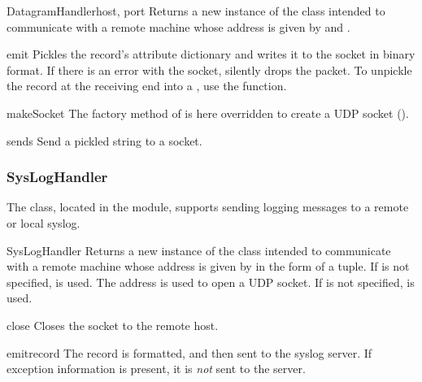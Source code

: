 \begin{classdesc}{DatagramHandler}{host, port}
Returns a new instance of the  class intended to
communicate with a remote machine whose address is given by 
and .
\end{classdesc}

\begin{methoddesc}{emit}{}
Pickles the record's attribute dictionary and writes it to the socket in
binary format. If there is an error with the socket, silently drops the
packet.
To unpickle the record at the receiving end into a , use the
 function.
\end{methoddesc}

\begin{methoddesc}{makeSocket}{}
The factory method of  is here overridden to create
a UDP socket ().
\end{methoddesc}

\begin{methoddesc}{send}{s}
Send a pickled string to a socket.
\end{methoddesc}

\subsubsection{SysLogHandler}

The  class, located in the
 module, supports sending logging messages to
a remote or local \UNIX{} syslog.

\begin{classdesc}{SysLogHandler}{}
Returns a new instance of the  class intended to
communicate with a remote \UNIX{} machine whose address is given by
 in the form of a 
tuple.  If  is not specified,  is
used.  The address is used to open a UDP socket.  If  is
not specified,  is used.
\end{classdesc}

\begin{methoddesc}{close}{}
Closes the socket to the remote host.
\end{methoddesc}

\begin{methoddesc}{emit}{record}
The record is formatted, and then sent to the syslog server. If
exception information is present, it is \emph{not} sent to the server.
\end{methoddesc}

